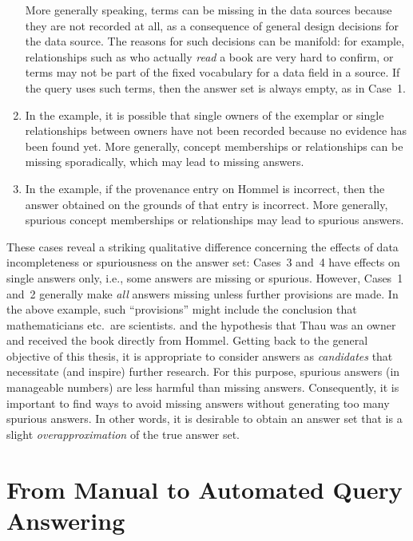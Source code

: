 \begin{enumerate}
    More generally speaking, terms can be missing in the data sources
    because they are not recorded at all, as a consequence of general design decisions
    for the data source. The reasons for such decisions can be manifold:
    for example, relationships such as who actually \emph{read} a book are very hard to confirm,
    or terms may not be part of the fixed vocabulary for a data field in a source.
    If the query uses such terms, then the answer set is always empty, as in Case~1.
  \item    
    In the example, it is possible that single owners of the exemplar or single relationships between owners
    have not been recorded because no evidence has been found yet.
    More generally, concept memberships or relationships can be missing sporadically,
    which may lead to missing answers.
  \item
    In the example, if the provenance entry on Hommel is incorrect, then the answer obtained on the grounds
    of that entry is incorrect.
    More generally, spurious concept memberships or relationships may lead to spurious answers.
\end{enumerate}
%
These cases reveal a striking qualitative difference concerning the effects of data incompleteness or spuriousness
on the answer set: Cases~3 and~4 have effects on single answers only, i.e., some answers are missing or spurious.
However, Cases~1 and~2 generally make \emph{all} answers missing unless further provisions are made.
In the above example, such ``provisions'' might include the conclusion that mathematicians etc.\ are scientists.
and the hypothesis that Thau was an owner and received the book directly from Hommel.
Getting back to the general objective of this thesis, it is appropriate to consider
answers as \emph{candidates} that necessitate (and inspire) further research.
For this purpose, spurious answers (in manageable numbers) are less harmful than missing answers.
Consequently, it is important to find ways to avoid missing answers without generating too many spurious answers.
In other words, it is desirable to obtain an answer set that is a slight \emph{overapproximation}
of the true answer set.

\section{From Manual to Automated Query Answering}
\label{sec:manual_vs_automated}

